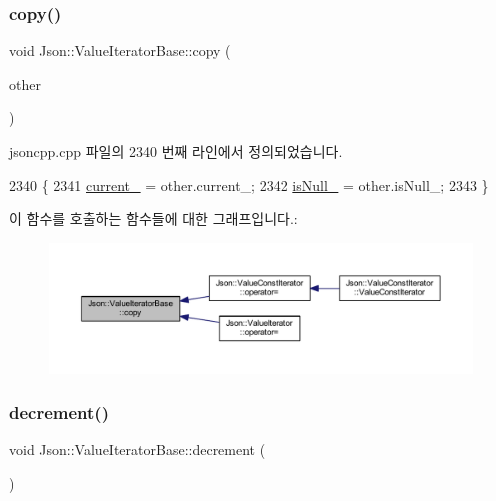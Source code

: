 \subsubsection{\texorpdfstring{copy()}{copy()}}
{\footnotesize\ttfamily void Json\+::\+Value\+Iterator\+Base\+::copy (\begin{DoxyParamCaption}\item[{const \hyperlink{class_json_1_1_value_iterator_base_a9d2a940d03ea06d20d972f41a89149ee}{Self\+Type} \&}]{other }\end{DoxyParamCaption})\hspace{0.3cm}{\ttfamily [protected]}}



jsoncpp.\+cpp 파일의 2340 번째 라인에서 정의되었습니다.


\begin{DoxyCode}
2340                                                   \{
2341   \hyperlink{class_json_1_1_value_iterator_base_ab3138ce8af8301cca3b041ea55cb922a}{current\_} = other.current\_;
2342   \hyperlink{class_json_1_1_value_iterator_base_a3e08b114a1aed9bde518c527f94a8c59}{isNull\_} = other.isNull\_;
2343 \}
\end{DoxyCode}
이 함수를 호출하는 함수들에 대한 그래프입니다.\+:
\nopagebreak
\begin{figure}[H]
\begin{center}
\leavevmode
\includegraphics[width=350pt]{class_json_1_1_value_iterator_base_a496e6aba44808433ec5858c178be5719_icgraph}
\end{center}
\end{figure}
\mbox{\label{class_json_1_1_value_iterator_base_affc8cf5ff54a9f432cc693362c153fa6}} 
\subsubsection{\texorpdfstring{decrement()}{decrement()}}
{\footnotesize\ttfamily void Json\+::\+Value\+Iterator\+Base\+::decrement (\begin{DoxyParamCaption}{ }\end{DoxyParamCaption})\hspace{0.3cm}{\ttfamily [protected]}}



